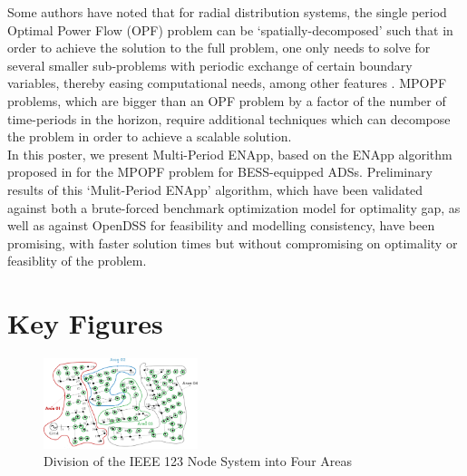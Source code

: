 \documentclass[conference]{IEEEtran} %
\begin{document}
Some authors have noted that for radial distribution systems, the single period Optimal Power Flow (OPF) problem can be `spatially-decomposed' such that in order to achieve the solution to the full problem, one only needs to solve for several smaller sub-problems with periodic exchange of certain boundary variables, thereby easing computational needs, among other features \cite{Sadnan}. MPOPF problems, which are bigger than an OPF problem by a factor of the number of time-periods in the horizon, require additional techniques which can decompose the problem in order to achieve a scalable solution. \\

In this poster, we present Multi-Period ENApp, based on the ENApp algorithm proposed in \cite{Sadnan} for the MPOPF problem for BESS-equipped ADSs. Preliminary results of this `Mulit-Period ENApp' algorithm, which have been validated against both a brute-forced benchmark optimization model for optimality gap, as well as against OpenDSS for feasibility and modelling consistency, have been promising, with faster solution times but without compromising on optimality or feasiblity of the problem. 

\section*{Key Figures}

\begin{figure}[h]
    \centering
    \includegraphics[width=0.4\textwidth]{figures/ieee123-FourAreas.png}
    \caption{Division of the IEEE 123 Node System into Four Areas}
    \label{fig:ieee123-four-areas}
\end{figure}
\end{document}
